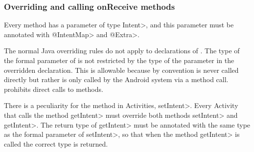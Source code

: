 \subsubsection{Overriding and calling onReceive methods\label{override-onreceive}}
Every \onReceive{} method has a parameter of type \<Intent>, and this
parameter must be annotated with \<@IntentMap> and \<@Extra>.

The normal Java overriding rules do not apply to declarations of \onReceive{}. The
type of the formal parameter of \onReceive{} is not restricted by the type of the
parameter in the overridden declaration. This is allowable because by convention
\onReceive{} is never called directly but rather is only called by the Android
system via a \sendIntent{} method call. \TheIntentChecker{} prohibits direct
calls to \onReceive{} methods.

There is a peculiarity for the \onReceive{} method in Activities, \<setIntent>.
Every Activity that calls the method \<getIntent> must override both methods
\<setIntent> and \<getIntent>. The return type of \<getIntent> must be annotated
with the same type as the formal parameter of \<setIntent>, so that when the
method \<getIntent> is called the correct type is returned.

